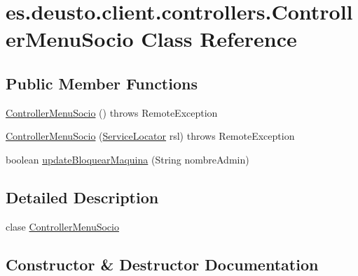 \hypertarget{classes_1_1deusto_1_1client_1_1controllers_1_1_controller_menu_socio}{}\section{es.\+deusto.\+client.\+controllers.\+Controller\+Menu\+Socio Class Reference}
\label{classes_1_1deusto_1_1client_1_1controllers_1_1_controller_menu_socio}
\subsection*{Public Member Functions}
\begin{DoxyCompactItemize}
\item 
\mbox{\hyperlink{classes_1_1deusto_1_1client_1_1controllers_1_1_controller_menu_socio_a4dce66b606637eb47832124197ca0037}{Controller\+Menu\+Socio}} ()  throws Remote\+Exception 
\item 
\mbox{\hyperlink{classes_1_1deusto_1_1client_1_1controllers_1_1_controller_menu_socio_a405a1354ffbd5cc5a2f2a9d0416b375f}{Controller\+Menu\+Socio}} (\mbox{\hyperlink{classes_1_1deusto_1_1client_1_1remote_1_1_service_locator}{Service\+Locator}} rsl)  throws Remote\+Exception 
\item 
boolean \mbox{\hyperlink{classes_1_1deusto_1_1client_1_1controllers_1_1_controller_menu_socio_a319cf89fcc5811cfe9e1e34ef96f06bf}{update\+Bloquear\+Maquina}} (String nombre\+Admin)
\end{DoxyCompactItemize}


\subsection{Detailed Description}
clase \mbox{\hyperlink{classes_1_1deusto_1_1client_1_1controllers_1_1_controller_menu_socio}{Controller\+Menu\+Socio}} 

\subsection{Constructor \& Destructor Documentation}
\mbox{\label{classes_1_1deusto_1_1client_1_1controllers_1_1_controller_menu_socio_a4dce66b606637eb47832124197ca0037}} 
